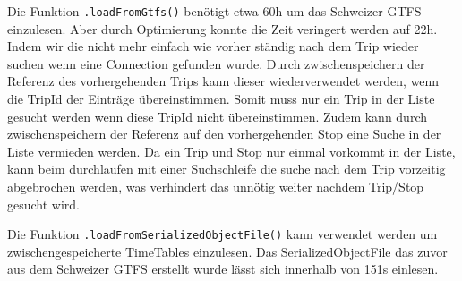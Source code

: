 Die Funktion \texttt{.loadFromGtfs()} benötigt etwa 60h um das Schweizer GTFS einzulesen. Aber durch Optimierung konnte die Zeit veringert werden auf 22h. Indem wir die nicht mehr einfach wie vorher ständig nach dem Trip wieder suchen wenn eine Connection gefunden wurde. Durch zwischenspeichern der Referenz des vorhergehenden Trips kann dieser wiederverwendet werden, wenn die TripId der Einträge übereinstimmen. Somit muss nur ein Trip in der Liste gesucht werden wenn diese TripId nicht übereinstimmen. Zudem kann durch zwischenspeichern der Referenz auf den vorhergehenden Stop eine Suche in der Liste vermieden werden. Da ein Trip und Stop nur einmal vorkommt in der Liste, kann beim durchlaufen mit einer Suchschleife die suche nach dem Trip vorzeitig abgebrochen werden, was verhindert das unnötig weiter nachdem Trip/Stop gesucht wird.  

Die Funktion \texttt{.loadFromSerializedObjectFile()} kann verwendet werden um zwischengespeicherte TimeTables einzulesen. Das SerializedObjectFile das zuvor aus dem Schweizer GTFS erstellt wurde lässt sich innerhalb von 151s einlesen.


